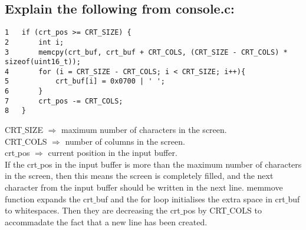 \documentclass[a4paper]{article}
\begin{document}
		 \subsection{Explain the following from console.c:}
		 \begin{minipage}{0.4\textwidth}
			\begin{lstlisting}
1	if (crt_pos >= CRT_SIZE) {
2		int i;
3		memcpy(crt_buf, crt_buf + CRT_COLS, (CRT_SIZE - CRT_COLS) * sizeof(uint16_t));
4		for (i = CRT_SIZE - CRT_COLS; i < CRT_SIZE; i++){
5			crt_buf[i] = 0x0700 | ' ';
6		}
7		crt_pos -= CRT_COLS;
8	}
			\end{lstlisting}
		 \end{minipage}
		 \vrule
		 \raggedright
		 \begin{minipage}{0.1\textwidth}
		 	\phantom{A}
		 \end{minipage}
		 \begin{minipage}{0.5\textwidth}
			CRT$\_$SIZE $\Rightarrow$ maximum number of characters in the screen.\\
			CRT$\_$COLS $\Rightarrow$ number of columns in the screen.\\
			crt$\_$pos $\Rightarrow$ current position in the input buffer.\\
			If the crt$\_$pos in the input buffer is more than the maximum number of characters in the screen, then this means the screen is completely filled, and the next character from the input buffer should be written in the next line. memmove function expands the crt$\_$buf and the for loop initialises the extra space in crt$\_$buf to whitespaces. Then they are decreasing the crt$\_$pos by CRT$\_$COLS to accommadate the fact that a new line has been created.
		 \end{minipage}
\end{document}

